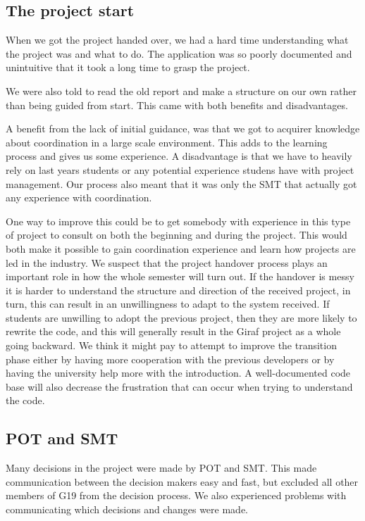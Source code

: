 \subsection{The project start}
When we got the project handed over, we had a hard time understanding what the project was and what to do. The application was so poorly documented and unintuitive that it took a long time to grasp the project.

We were also told to read the old report and make a structure on our own rather than being guided from start. This came with both benefits and disadvantages.

A benefit from the lack of initial guidance, was that we got to acquirer knowledge about coordination in a large scale environment. This adds to the learning process and gives us some experience. A disadvantage is that we have to heavily rely on last years students or any potential experience studens have with project management. Our process also meant that it was only the \gls{SMT} that actually got any experience with coordination. 

One way to improve this could be to get somebody with experience in this type of project to consult on both the beginning and during the project. This would both make it possible to gain coordination experience and learn how projects are led in the industry. We suspect that the project handover process plays an important role in how the whole semester will turn out. If the handover is messy it is harder to understand the structure and direction of the received project, in turn, this can result in an unwillingness to adapt to the system received. If students are unwilling to adopt the previous project, then they are more likely to rewrite the code, and this will generally result in the Giraf project as a whole going backward. We think it might pay to attempt to improve the transition phase either by having more cooperation with the previous developers or by having the university help more with the introduction. A well-documented code base will also decrease the frustration that can occur when trying to understand the code.

\subsection{\gls{POT} and \gls{SMT}}
Many decisions in the project were made by \gls{POT} and \gls{SMT}. This made communication between the decision makers easy and fast, but excluded all other members of \gls{G19} from the decision process. We also experienced problems with communicating which decisions and changes were made.

